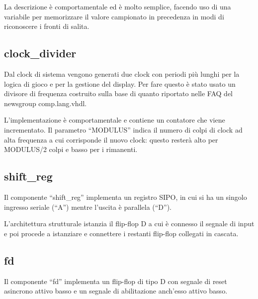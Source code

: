 \documentclass [11pt,a4paper,oneside,draft]{article}
\begin{document}


La descrizione è comportamentale ed è molto semplice, facendo uso di
una variabile per memorizzare il valore campionato in precedenza in
modi di riconoscere i fronti di salita.



\subsection{clock\_divider}

Dal clock di sistema vengono generati due clock con periodi più
lunghi per la logica di gioco e per la gestione del display.
Per fare questo è stato usato un divisore di frequenza costruito
sulla base di quanto riportato nelle FAQ del newsgroup
comp.lang.vhdl.



L'implementazione è comportamentale e contiene un contatore che viene
incrementato. Il parametro ``MODULUS'' indica il numero di colpi di
clock ad alta frequenza a cui corrisponde il nuovo clock: questo
resterà alto per MODULUS/2 colpi e basso per i rimanenti.



\subsection{shift\_reg}

Il componente ``shift\_reg'' implementa un registro SIPO, in cui
si ha un singolo ingresso seriale (``A'') mentre l'uscita è
parallela (``D'').



L'architettura strutturale istanzia il flip-flop D a cui è connesso
il segnale di input e poi procede a istanziare e connettere i restanti
flip-flop collegati in cascata.



\subsection{fd}

Il componente ``fd'' implementa un flip-flop di tipo D con segnale di
reset asincrono attivo basso e un segnale di abilitazione anch'esso
attivo basso.
\end{document}
